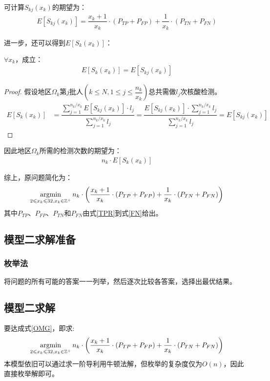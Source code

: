 \documentclass[withoutpreface,bwprint]{cumcmthesis} %
\begin{document}
可计算$ S_{kj}(x_k)$的期望为：
\begin{align*}
    E[S_{kj}(x_k)]=\dfrac{x_k+1}{x_k}\cdot (P_{TP}+P_{FP})+\dfrac{1}{x_k}\cdot (P_{TN}+P_{FN})
\end{align*}

进一步，还可以得到$E[S_k(x_k)]$：
\begin{theorem}
\label{thm-1}
$\forall x_k$，成立：
\begin{align}
    E[S_k(x_k)]=E[S_{kj}(x_k)]
\end{align}
\end{theorem}

\begin{proof}
    假设地区$\Omega_k$第$j$批人$(k\leqslant N,1 \leqslant j \leqslant \dfrac{n_k}{x_k})$总共需做$l_j$次核酸检测。
    \begin{align*}
        E[S_k(x_k)]&=\dfrac{\sum\limits^{n_k/x_k}_{j=1} E[S_{kj}(x_k)]\cdot l_j }{\sum\limits^{n_k/x_k}_{j=1} l_j}  
        =\dfrac{E[S_{kj}(x_k)]\cdot \sum\limits^{n_k/x_k}_{j=1} l_j }{\sum\limits^{n_k/x_k}_{j=1} l_j}
        =E[S_{kj}(x_k)]
    \end{align*}
\end{proof}

因此地区$\Omega_k$所需的检测次数的期望为：
\begin{align}
    {n_k}\cdot{E[S_k(x_k)]}
\end{align}

综上，原问题简化为：
\begin{align}
\label{OMG}
    \operatorname*{\rm argmin}_{2\leqslant x_k \leqslant 32,x_k\in\mathbb{Z}^+}n_k\cdot\left(\dfrac{x_k+1}{x_k}\cdot (P_{TP}+P_{FP})+\dfrac{1}{x_k}\cdot (P_{TN}+P_{FN})\right)
\end{align}
其中$P_{TP}$、$P_{FP}$、$P_{TN}$和$P_{FN}$由式\ref{TPR}到式\ref{FN}给出。%

\subsection{模型二求解准备}
\subsubsection{枚举法}
将问题的所有可能的答案一一列举，然后逐次比较各答案，选择出最优结果。
\subsection{模型二求解}
要达成式\ref{OMG}，即求:
\begin{align}
    \operatorname*{\rm argmin}_{2\leqslant x_k \leqslant 32,x_k\in\mathbb{Z}^+}n_k\cdot\left(\dfrac{x_k+1}{x_k}\cdot (P_{TP}+P_{FP})+\dfrac{1}{x_k}\cdot (P_{TN}+P_{FN})\right)
\end{align}
本模型依旧可以通过求一阶导利用牛顿法解，但枚举的复杂度仅为$O(n)$，因此直接枚举解即可。
\end{document}
